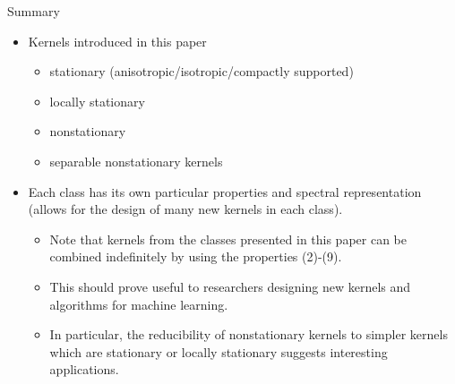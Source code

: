 \documentclass[
  ignorenonframetext,
]{beamer}
\providecommand{\tightlist}{%
  \setlength{\itemsep}{0pt}\setlength{\parskip}{0pt}}
\begin{document}
\begin{frame}{Summary}
\protect\hypertarget{summary}{}
\begin{itemize}
\tightlist
\item
  Kernels introduced in this paper

  \begin{itemize}
  \tightlist
  \item
    stationary (anisotropic/isotropic/compactly supported)
  \item
    locally stationary
  \item
    nonstationary
  \item
    separable nonstationary kernels
  \end{itemize}
\item
  Each class has its own particular properties and spectral
  representation (allows for the design of many new kernels in each
  class).

  \begin{itemize}
  \tightlist
  \item
    Note that kernels from the classes presented in this paper can be
    combined indefinitely by using the properties (2)-(9).
  \item
    This should prove useful to researchers designing new kernels and
    algorithms for machine learning.
  \item
    In particular, the reducibility of nonstationary kernels to simpler
    kernels which are stationary or locally stationary suggests
    interesting applications.
  \end{itemize}
\end{itemize}
\end{frame}
\end{document}
